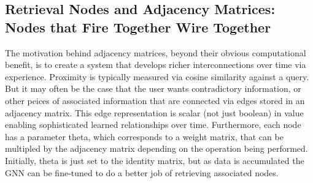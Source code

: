 \subsection{Retrieval Nodes and Adjacency Matrices: Nodes that Fire Together Wire Together}

The motivation behind adjacency matrices, beyond their obvious computational benefit, is to create a system that develops richer interconnections over time
via experience. Proximity is typically measured via cosine similarity against a query. But it may often be the case that the user wants contradictory information, or other peices of associated information that are connected via edges stored in an adjacency matrix. This edge representation is scalar (not just boolean) in value enabling sophisticated learned relationships over time. Furthermore, each node has a parameter theta, which corresponds to a weight matrix, that can be multipled by the adjacency matrix depending on the operation being performed. Initially, theta is just set to the identity matrix, but as data is accumulated the GNN can be fine-tuned to do a better job of retrieving associated nodes.
